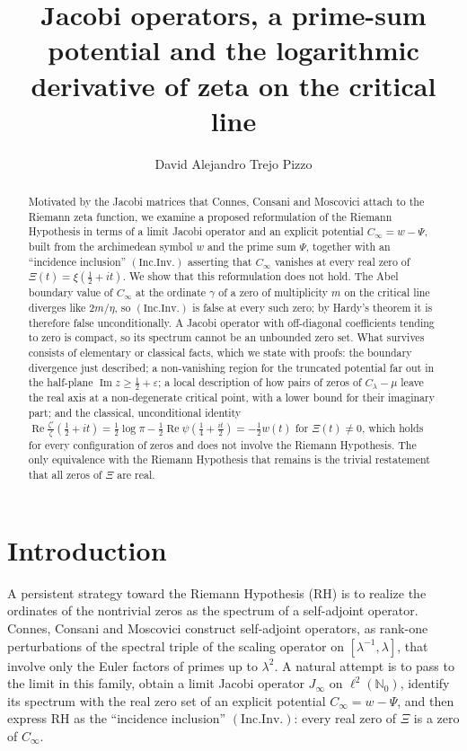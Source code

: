 \documentclass[11pt]{amsart}
\title[Jacobi operators, prime potentials and the critical line]{Jacobi operators, a prime-sum
potential and the logarithmic derivative of zeta on the critical line}
\author{David Alejandro Trejo Pizzo}
\theoremstyle{definition}
\theoremstyle{remark}
\newcommand{\RH}{\mathrm{RH}}
\renewcommand{\Re}{\operatorname{Re}}
\renewcommand{\Im}{\operatorname{Im}}
\newcommand{\half}{\tfrac12}
\newcommand{\Cinf}{C_\infty}
\newcommand{\Clam}{C_\lambda}
\newcommand{\Jinf}{J_\infty}
\newcommand{\incInv}{(\mathrm{Inc.Inv.})}
\begin{document}
\begin{abstract}
Motivated by the Jacobi matrices that Connes, Consani and Moscovici attach to the Riemann zeta
function, we examine a proposed reformulation of the Riemann Hypothesis in terms of a limit
Jacobi operator and an explicit potential $\Cinf=w-\Psi$, built from the archimedean symbol $w$
and the prime sum $\Psi$, together with an ``incidence inclusion'' $\incInv$ asserting that
$\Cinf$ vanishes at every real zero of $\Xi(t)=\xi(\half+it)$. We show that this reformulation
does not hold. The Abel boundary value of $\Cinf$ at the ordinate $\gamma$ of a zero of
multiplicity $m$ on the critical line diverges like $2m/\eta$, so $\incInv$ is false at every
such zero; by Hardy's theorem it is therefore false unconditionally. A Jacobi operator with
off-diagonal coefficients tending to zero is compact, so its spectrum cannot be an unbounded
zero set. What survives consists of elementary or classical facts, which we state with proofs:
the boundary divergence just described; a non-vanishing region for the truncated potential far
out in the half-plane $\Im z\ge\half+\varepsilon$; a local description of how pairs of zeros of
$\Clam-\mu$ leave the real axis at a non-degenerate critical point, with a lower bound for their
imaginary part; and the classical, unconditional identity
$\Re\frac{\zeta'}{\zeta}(\half+it)=\half\log\pi-\half\Re\psi(\tfrac14+\tfrac{it}2)=-\half w(t)$
for $\Xi(t)\neq0$, which holds for every configuration of zeros and does not involve the Riemann
Hypothesis. The only equivalence with the Riemann Hypothesis that remains is the trivial
restatement that all zeros of $\Xi$ are real.
\end{abstract}
\maketitle

\tableofcontents
\newpage

\section{Introduction}

A persistent strategy toward the Riemann Hypothesis ($\RH$) is to realize the ordinates of the
nontrivial zeros as the spectrum of a self-adjoint operator. Connes, Consani and Moscovici
\cite{CCM} construct self-adjoint operators, as rank-one perturbations of the spectral triple of
the scaling operator on $[\lambda^{-1},\lambda]$, that involve only the Euler factors of primes
up to $\lambda^2$. A natural attempt is to pass to the limit in this family,
obtain a limit Jacobi operator $\Jinf$ on $\ell^2(\mathbb N_0)$, identify its spectrum with the
real zero set of an explicit potential $\Cinf=w-\Psi$, and then express $\RH$ as the
``incidence inclusion'' $\incInv$: every real zero of $\Xi$ is a zero of $\Cinf$.
\end{document}
